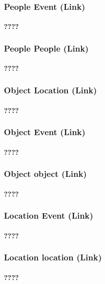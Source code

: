 \documentclass{acm_proc_article-sp}
\begin{document}
\subsubsection{People Event (Link)}
\paragraph{????}
\subsubsection{People People (Link)}
\paragraph{????}
\subsubsection{Object Location (Link)}
\paragraph{????}
\subsubsection{Object Event (Link)}
\paragraph{????}
\subsubsection{Object object (Link)}
\paragraph{????}
\subsubsection{Location Event (Link)}
\paragraph{????}
\subsubsection{Location location (Link)}
\paragraph{????}
\end{document}

